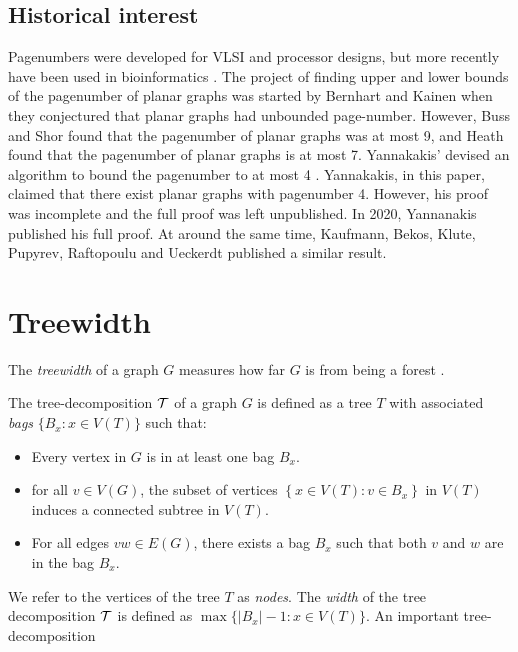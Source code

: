 \subsection{Historical interest}\label{ssec:Pagenumber_History}
Pagenumbers were developed for VLSI and processor designs, but more recently have been used in bioinformatics \cite{haslingerRNAStructuresPseudoknots1999}. 
The project of finding upper and lower bounds of the pagenumber of planar graphs was started by Bernhart and Kainen when they conjectured that planar graphs had unbounded page-number. However, Buss and Shor\cite{bussPagenumberPlanarGraphs1984} found that the pagenumber of planar graphs was at most 9, and Heath \cite{heathEmbeddingPlanarGraphs1984} found that the pagenumber of planar graphs is at most 7. Yannakakis' devised an algorithm to bound the pagenumber to at most 4 \cite{yannakakisEmbeddingPlanarGraphs1989}. Yannakakis, in this paper, claimed that there exist planar graphs with pagenumber 4. However, his proof was incomplete and the full proof was left unpublished. In 2020, Yannanakis published his full proof. \cite{yannakakisPlanarGraphsThat2020} At around the same time, Kaufmann, Bekos, Klute, Pupyrev, Raftopoulu and Ueckerdt published a similar result\cite{kaufmannFourPagesAre2020}. 

\section{Treewidth}\label{sec:treewidth}

The \textit{treewidth} of a graph $G$ measures how far $G$ is from being a forest \cite{diestelGraphMinors2017}. 

\begin{definition}\label{def:tree-decomposition}
	The tree-decomposition $\mathcal{T}$ of a graph $G$ is defined as a tree $T$ with associated \textit{bags} $\lbrace B_x : x \in V(T) \rbrace$ such that:
	\begin{itemize}
		\item Every vertex in $G$ is in at least one bag $B_x$. 
		\item for all $v \in V(G)$, the subset of vertices $\left\lbrace x \in V(T): v \in B_x \right\rbrace$ in $V(T)$ induces a connected subtree in $V(T)$.
		\item For all edges $vw \in E(G)$, there exists a bag $B_x$ such that both $v$ and $w$ are in the bag $B_x$.
	\end{itemize}
\end{definition}
We refer to the vertices of the tree $T$ as \textit{nodes}. 
The \textit{width} of the tree decomposition $\mathcal{T}$ is defined as $\max \lbrace |B_x| - 1 : x \in V(T) \rbrace$. An important tree-decomposition 

